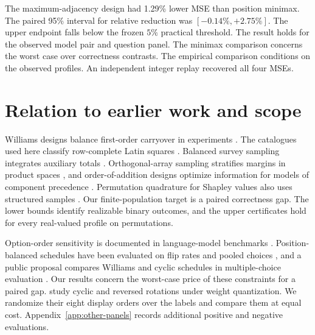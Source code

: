 \documentclass{article}
\begin{document}
The maximum-adjacency design had 1.29\% lower MSE than
position minimax. The paired 95\% interval for relative reduction
was \([-0.14\%,+2.75\%]\).
The upper endpoint falls below the frozen $5\%$ practical threshold.
The result holds for the observed model pair and question panel.
The minimax comparison concerns the worst case over correctness
contrasts. The empirical comparison conditions on the observed
profiles. An independent integer replay recovered all four MSEs.

\section{Relation to earlier work and scope}
Williams designs balance first-order carryover in experiments
\citep{williams1949}. The catalogues used here classify row-complete Latin
squares \citep{wanlesscatalogue}. Balanced survey sampling integrates
auxiliary totals \citep{deville2004}. Orthogonal-array sampling
stratifies margins in product spaces \citep{owen1992}, and
order-of-addition designs optimize information for models of component
precedence \citep{peng2019}. Permutation quadrature for Shapley values
also uses structured samples \citep{mitchell2022,yang2023}. Our
finite-population target is a paired correctness gap. The lower bounds
identify realizable binary outcomes, and the upper certificates hold
for every real-valued profile on permutations.

Option-order sensitivity is documented in language-model benchmarks
\citep{zheng2024,pez2024}. Position-balanced schedules have been
evaluated on flip rates and pooled choices \citep{ok2026}, and a public
proposal compares Williams and cyclic schedules in multiple-choice
evaluation \citep{lacuna}. Our results concern the worst-case price of
these constraints for a paired gap. \citet{khan2026} study cyclic
and reversed rotations under weight quantization. We randomize their
eight display orders over the labels and compare them at equal cost. Appendix~\ref{app:other-panels}
records additional positive and negative evaluations.
\end{document}
